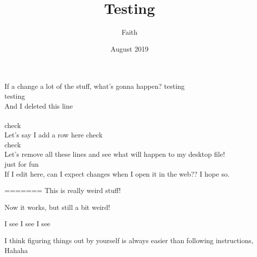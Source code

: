 \documentclass{article}
\title{Testing}
\date{August 2019}
\author{Faith}
\begin{document}
\maketitle
If a change a lot of the stuff, what's gonna happen?
testing \\
testing\\
And I deleted this line
\\
\\
check\\


Let's say I add a row here
check\\
check\\
Let's remove all these lines and see what will happen to my desktop file!
\\
just for fun
\\

If I edit here, can I expect changes when I open it in the web?? I hope so.


=======
This is really weird stuff!


Now it works, but still a bit weird!

I see I see I see 



I think figuring things out by yourself is always easier than following instructions, Hahaha
\end{document}
